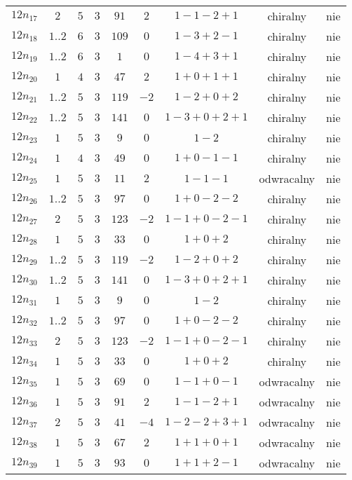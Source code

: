 \begin{longtable}{ccccccccc}
$12n_{17}$ & $2$ & $5$ & $3$ & $91$ & $2$ & $1-1-2+1$ & chiralny & nie \\
$12n_{18}$ & $1..2$ & $6$ & $3$ & $109$ & $0$ & $1-3+2-1$ & chiralny & nie \\
$12n_{19}$ & $1..2$ & $6$ & $3$ & $1$ & $0$ & $1-4+3+1$ & chiralny & nie \\
$12n_{20}$ & $1$ & $4$ & $3$ & $47$ & $2$ & $1+0+1+1$ & chiralny & nie \\
$12n_{21}$ & $1..2$ & $5$ & $3$ & $119$ & $-2$ & $1-2+0+2$ & chiralny & nie \\
$12n_{22}$ & $1..2$ & $5$ & $3$ & $141$ & $0$ & $1-3+0+2+1$ & chiralny & nie \\
$12n_{23}$ & $1$ & $5$ & $3$ & $9$ & $0$ & $1-2$ & chiralny & nie \\
$12n_{24}$ & $1$ & $4$ & $3$ & $49$ & $0$ & $1+0-1-1$ & chiralny & nie \\
$12n_{25}$ & $1$ & $5$ & $3$ & $11$ & $2$ & $1-1-1$ & odwracalny & nie \\
$12n_{26}$ & $1..2$ & $5$ & $3$ & $97$ & $0$ & $1+0-2-2$ & chiralny & nie \\
$12n_{27}$ & $2$ & $5$ & $3$ & $123$ & $-2$ & $1-1+0-2-1$ & chiralny & nie \\
$12n_{28}$ & $1$ & $5$ & $3$ & $33$ & $0$ & $1+0+2$ & chiralny & nie \\
$12n_{29}$ & $1..2$ & $5$ & $3$ & $119$ & $-2$ & $1-2+0+2$ & chiralny & nie \\
$12n_{30}$ & $1..2$ & $5$ & $3$ & $141$ & $0$ & $1-3+0+2+1$ & chiralny & nie \\
$12n_{31}$ & $1$ & $5$ & $3$ & $9$ & $0$ & $1-2$ & chiralny & nie \\
$12n_{32}$ & $1..2$ & $5$ & $3$ & $97$ & $0$ & $1+0-2-2$ & chiralny & nie \\
$12n_{33}$ & $2$ & $5$ & $3$ & $123$ & $-2$ & $1-1+0-2-1$ & chiralny & nie \\
$12n_{34}$ & $1$ & $5$ & $3$ & $33$ & $0$ & $1+0+2$ & chiralny & nie \\
$12n_{35}$ & $1$ & $5$ & $3$ & $69$ & $0$ & $1-1+0-1$ & odwracalny & nie \\
$12n_{36}$ & $1$ & $5$ & $3$ & $91$ & $2$ & $1-1-2+1$ & odwracalny & nie \\
$12n_{37}$ & $2$ & $5$ & $3$ & $41$ & $-4$ & $1-2-2+3+1$ & odwracalny & nie \\
$12n_{38}$ & $1$ & $5$ & $3$ & $67$ & $2$ & $1+1+0+1$ & odwracalny & nie \\
$12n_{39}$ & $1$ & $5$ & $3$ & $93$ & $0$ & $1+1+2-1$ & odwracalny & nie \\

\end{longtable}
